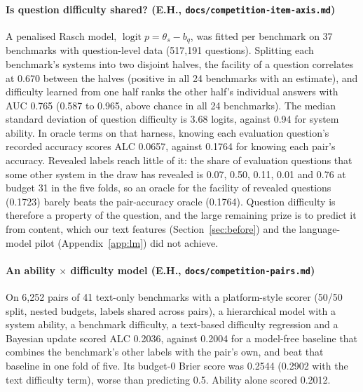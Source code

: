 \documentclass{article}
\newcommand{\code}[1]{\texttt{#1}}
\begin{document}
\paragraph{Is question difficulty shared? (E.H., \code{docs/competition-item-axis.md})} A penalised Rasch model, $\operatorname{logit} p = \theta_s - b_q$, was fitted per benchmark on 37 benchmarks with question-level data (517{,}191 questions). Splitting each benchmark's systems into two disjoint halves, the facility of a question correlates at 0.670 between the halves (positive in all 24 benchmarks with an estimate), and difficulty learned from one half ranks the other half's individual answers with AUC 0.765 (0.587 to 0.965, above chance in all 24 benchmarks). The median standard deviation of question difficulty is 3.68 logits, against 0.94 for system ability. In oracle terms on that harness, knowing each evaluation question's recorded accuracy scores ALC 0.0657, against 0.1764 for knowing each pair's accuracy. Revealed labels reach little of it: the share of evaluation questions that some other system in the draw has revealed is 0.07, 0.50, 0.11, 0.01 and 0.76 at budget 31 in the five folds, so an oracle for the facility of revealed questions (0.1723) barely beats the pair-accuracy oracle (0.1764). Question difficulty is therefore a property of the question, and the large remaining prize is to predict it from content, which our text features (Section~\ref{sec:before}) and the language-model pilot (Appendix~\ref{app:lm}) did not achieve.

\paragraph{An ability $\times$ difficulty model (E.H., \code{docs/competition-pairs.md})} On 6{,}252 pairs of 41 text-only benchmarks with a platform-style scorer (50/50 split, nested budgets, labels shared across pairs), a hierarchical model with a system ability, a benchmark difficulty, a text-based difficulty regression and a Bayesian update scored ALC 0.2036, against 0.2004 for a model-free baseline that combines the benchmark's other labels with the pair's own, and beat that baseline in one fold of five. Its budget-0 Brier score was 0.2544 (0.2902 with the text difficulty term), worse than predicting 0.5. Ability alone scored 0.2012.
\end{document}
